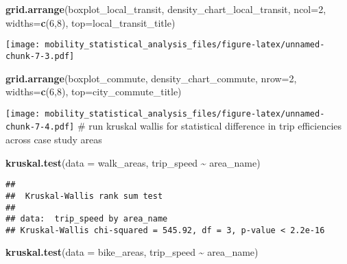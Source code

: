 \documentclass[
]{article}
\newenvironment{Shaded}{\begin{snugshade}}{\end{snugshade}}
\newcommand{\AttributeTok}[1]{\textcolor[rgb]{0.13,0.29,0.53}{#1}}
\newcommand{\DecValTok}[1]{\textcolor[rgb]{0.00,0.00,0.81}{#1}}
\newcommand{\FunctionTok}[1]{\textcolor[rgb]{0.13,0.29,0.53}{\textbf{#1}}}
\newcommand{\NormalTok}[1]{#1}
\newcommand{\SpecialCharTok}[1]{\textcolor[rgb]{0.81,0.36,0.00}{\textbf{#1}}}
\begin{document}
\begin{Shaded}
\begin{Highlighting}[]
\FunctionTok{grid.arrange}\NormalTok{(boxplot\_local\_transit, density\_chart\_local\_transit, }\AttributeTok{ncol=}\DecValTok{2}\NormalTok{, }\AttributeTok{widths=}\FunctionTok{c}\NormalTok{(}\DecValTok{6}\NormalTok{,}\DecValTok{8}\NormalTok{), }\AttributeTok{top=}\NormalTok{local\_transit\_title)}
\end{Highlighting}
\end{Shaded}

\texttt{[image: mobility\_statistical\_analysis\_files/figure-latex/unnamed-chunk-7-3.pdf]}

\begin{Shaded}
\begin{Highlighting}[]
\FunctionTok{grid.arrange}\NormalTok{(boxplot\_commute, density\_chart\_commute, }\AttributeTok{nrow=}\DecValTok{2}\NormalTok{, }\AttributeTok{widths=}\FunctionTok{c}\NormalTok{(}\DecValTok{6}\NormalTok{,}\DecValTok{8}\NormalTok{), }\AttributeTok{top=}\NormalTok{city\_commute\_title)}
\end{Highlighting}
\end{Shaded}

\texttt{[image: mobility\_statistical\_analysis\_files/figure-latex/unnamed-chunk-7-4.pdf]}
\# run kruskal wallis for statistical difference in trip efficiencies
across case study areas

\begin{Shaded}
\begin{Highlighting}[]
\FunctionTok{kruskal.test}\NormalTok{(}\AttributeTok{data =}\NormalTok{ walk\_areas, trip\_speed }\SpecialCharTok{\textasciitilde{}}\NormalTok{ area\_name)}
\end{Highlighting}
\end{Shaded}

\begin{verbatim}
## 
##  Kruskal-Wallis rank sum test
## 
## data:  trip_speed by area_name
## Kruskal-Wallis chi-squared = 545.92, df = 3, p-value < 2.2e-16
\end{verbatim}

\begin{Shaded}
\begin{Highlighting}[]
\FunctionTok{kruskal.test}\NormalTok{(}\AttributeTok{data =}\NormalTok{ bike\_areas, trip\_speed }\SpecialCharTok{\textasciitilde{}}\NormalTok{ area\_name)}
\end{Highlighting}
\end{Shaded}
\end{document}
